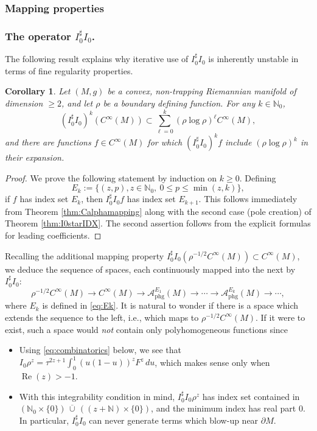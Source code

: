 \documentclass[11pt]{article}
\newcommand{\ie}{i.e.,\xspace}
\newcommand{\Subsubsection}{\subsubsection}
\let\cal\mathcal
\DeclareMathOperator{\Real}{Re}
\theoremstyle{plain}
\newtheorem{Corollary}[Theorem]{Corollary}
\theoremstyle{definition}
\theoremstyle{remark}
\def\Nm{{\mathbb{N}}}
\newcommand{\adj}{I_0^\sharp}
\newcommand{\phg}{\mathrm{phg}}
\begin{document}
\Subsubsection{Mapping properties}

\subsubsection*{The operator $\adj I_0$.}
The following result explains why iterative use of $\adj I_0$ is inherently unstable in terms of fine regularity
properties.

\begin{Corollary} Let $(M,g)$ be a convex, non-trapping Riemannian manifold of dimension $\ge 2$, and let $\rho$ be a boundary defining function. For any $k\in \Nm_0$,
\begin{equation*}
(\adj I_0)^k (C^\infty(M)) \subset \sum_{\ell=0}^k (\rho\log \rho)^\ell C^\infty(M),
\end{equation*}
and there are functions $f \in C^\infty(M)$ for which $(\adj I_0)^k f$ include $(\rho\log \rho)^k$ in their expansion.
\end{Corollary}

\begin{proof}
We prove the following statement by induction on $k\ge 0$. Defining
\begin{equation}
E_k := \{ (z,p), z\in \Nm_0,\ 0\le p\le \min (z,k) \},
\label{eq:Ek}
\end{equation}
if $f$ has index set $E_k$, then $\adj I_0 f$ has index set $E_{k+1}$. This follows immediately from Theorem \ref{thm:Calphamapping} along with the second case (pole creation) of Theorem \ref{thm:I0starIDX}. The second assertion follows from the explicit formulas for leading coefficients.
\end{proof}

Recalling the additional mapping property $\adj I_0 (\rho^{-1/2} C^\infty (M))\subset C^\infty(M)$, we deduce the sequence of spaces, each continuously mapped into the next by $\adj I_0$:
\begin{equation}
\rho^{-1/2} C^\infty(M) \to C^\infty(M) \to {\cal A}_{\phg}^{E_1} (M) \to \cdots \to {\cal A}_{\phg}^{E_k} (M) \to \cdots,
\label{eq:seqspaces}
\end{equation}
where $E_k$ is defined in \eqref{eq:Ek}. It is natural to wonder if there is a space which extends the sequence to the left, \ie which maps to $\rho^{-1/2} C^\infty(M)$. If it were to exist, such a space would {\it not} contain only polyhomogeneous functions since
\begin{itemize}
\item Using \eqref{eq:combinatorics} below, we see that $I_0 \rho^z = \tau^{2z+1} \int_0^1 (u(1-u))^z F^z\,du$, which makes sense only when $\Real(z)>-1$.
\item With this integrability condition in mind, $\adj I_0 \rho^z$ has index set contained in $(\Nm_0 \times \{0\})\, \overline{\cup} \, ((z+\Nm)\times \{0\})$, and the minimum index has real part $0$. In particular, $\adj I_0$ can never generate terms which blow-up near $\partial M$.
\end{itemize}
\end{document}
